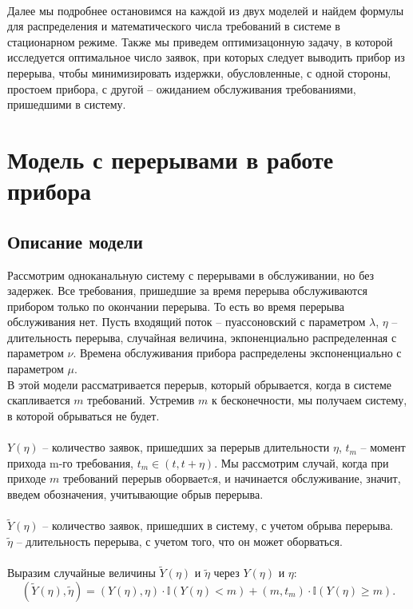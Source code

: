 \documentclass[12pt]{article}
\begin{document}
\\
Далее мы подробнее остановимся на каждой из двух моделей и найдем формулы для распределения и математического числа требований в системе в стационарном режиме. Также мы приведем оптимизацонную задачу, в которой исследуется оптимальное число заявок, при которых следует выводить прибор из перерыва, чтобы минимизировать издержки, обусловленные, с одной стороны, простоем прибора, с другой -- ожиданием обслуживания требованиями, пришедшими в систему.
\\ 
\section{Модель с перерывами в работе прибора}
\subsection{Описание модели}
Рассмотрим одноканальную систему с перерывами в обслуживании, но без задержек. Все требования, пришедшие за время перерыва обслуживаются прибором только по окончании перерыва. То есть во время перерыва обслуживания нет. Пусть входящий поток -- пуассоновский с параметром $\lambda$, $\eta$ -- длительность перерыва, случайная величина, экпоненциально распределенная с параметром $\nu$. Времена обслуживания прибора распределены экспоненциально с параметром $\mu$.\\
В этой модели рассматривается перерыв, который обрывается, когда в системе скапливается $m$ требований. Устремив $m$ к бесконечности, мы получаем систему, в которой обрываться не будет.\\
\\
$Y(\eta)$ -- количество заявок, пришедших за перерыв длительности $\eta$, $t_m$ -- момент прихода m-го требования, $t_m \in (t, t+\eta)$. Мы рассмотрим случай, когда при приходе $m$ требований перерыв оборваетcя, и начинается обслуживание, значит, введем обозначения, учитывающие обрыв перерыва.\\
\\
$\tilde{Y}(\eta)$ -- количество заявок, пришедших в систему, с учетом обрыва перерыва.\\
$\tilde{\eta}$ -- длительность перерыва, с учетом того, что он может оборваться.\\
\\
Выразим случайные величины $\tilde{Y}(\eta)$ и $\tilde{\eta}$ через $Y(\eta)$ и $\eta$:
$$ (\tilde{Y}(\eta), \tilde{\eta}) = (Y(\eta), \eta)\cdot\mathbb{I}(Y(\eta) < m) + (m, t_m)\cdot\mathbb{I}(Y(\eta) \geqslant m). $$
\end{document}
